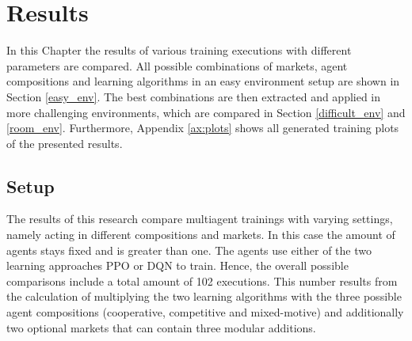 %
%
\chapter{Results}\label{sec:Results}
In this Chapter the results of various training executions with different parameters are compared. All possible combinations of markets, agent compositions and learning algorithms in an easy environment setup are shown in Section \ref{easy_env}. The best combinations are then extracted and applied in more challenging environments, which are compared in Section \ref{difficult_env} and \ref{room_env}. Furthermore, Appendix \ref{ax:plots} shows all generated training plots of the presented results.

\section{Setup} \label{setup}

The results of this research compare multiagent trainings with varying settings, namely acting in different compositions and markets. In this case the amount of agents stays fixed and is greater than one. The agents use either of the two learning approaches PPO or DQN to train. Hence, the overall possible comparisons include a total amount of 102 executions. This number results from the calculation of multiplying the two learning algorithms with the three possible agent compositions (cooperative, competitive and mixed-motive) and additionally two optional markets that can contain three modular additions. 

